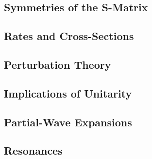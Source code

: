 \subsection{Symmetries of the S-Matrix}\label{susec:3_3}



\subsection{Rates and Cross-Sections}\label{susec:3_4}



\subsection{Perturbation Theory}\label{susec:3_5}



\subsection{Implications of Unitarity}\label{susec:3_6}



\subsection{Partial-Wave Expansions}\label{susec:3_7}



\subsection{Resonances}\label{susec:3_8}
